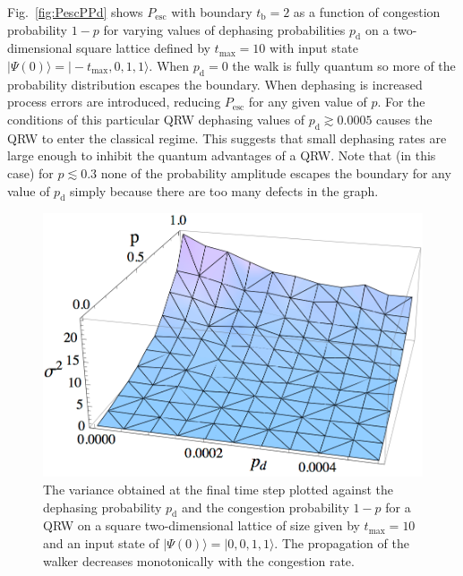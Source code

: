 \documentclass[aps,pra,twocolumn,amsmath,amssymb,nofootinbib,superscriptaddress]{revtex4}
\newcommand{\ket}[1]{|#1\rangle}
\begin{document}
Fig.~\ref{fig:PescPPd} shows $P_\mathrm{esc}$ with boundary $t_\mathrm{b}=2$ as a function of congestion probability $1-p$ for varying values of dephasing probabilities $p_{\mathrm{d}}$ on a two-dimensional square lattice defined by $t_\mathrm{max}=10$ with input state $\ket{\Psi(0)}=\ket{-t_\mathrm{max},0,1,1}$. When $p_{\mathrm{d}}=0$ the walk is fully quantum so more of the probability distribution escapes the boundary. When dephasing is increased process errors are introduced, reducing $P_{\mathrm{esc}}$ for any given value of $p$. For the conditions of this particular QRW dephasing values of $p_{\mathrm{d}}\gtrsim 0.0005$ causes the QRW to enter the classical regime. This suggests that small dephasing rates are large enough to inhibit the quantum advantages of a QRW. Note that (in this case) for $p\lesssim0.3$ none of the probability amplitude escapes the boundary for any value of $p_{\mathrm{d}}$ simply because there are too many defects in the graph.

\begin{figure}[]
\includegraphics[scale=0.5]{DepPercVar.pdf}
\caption{\label{fig:DepPercVar} The variance obtained at the final time step plotted against the dephasing probability $p_{\mathrm{d}}$ and the congestion probability $1-p$ for a QRW on a square two-dimensional lattice of size given by $t_\mathrm{max}=10$ and an input state of $\ket{\Psi(0)}=\ket{0,0,1,1}$. The propagation of the walker decreases monotonically with the congestion rate.}
\end{figure}
\end{document}

